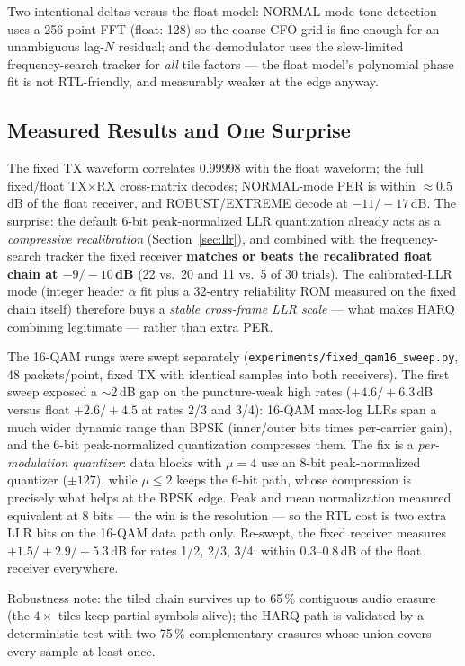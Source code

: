 Two intentional deltas versus the float model: NORMAL-mode tone
detection uses a 256-point FFT (float: 128) so the coarse CFO grid is
fine enough for an unambiguous lag-$N$ residual; and the demodulator
uses the slew-limited frequency-search tracker for \emph{all} tile
factors --- the float model's polynomial phase fit is not RTL-friendly,
and measurably weaker at the edge anyway.

\subsection{Measured Results and One Surprise}

The fixed TX waveform correlates 0.99998 with the float waveform; the
full fixed/float TX$\times$RX cross-matrix decodes; NORMAL-mode PER is
within $\approx$0.5\,dB of the float receiver, and ROBUST/EXTREME
decode at $-11/-17$\,dB.  The surprise: the default 6-bit
peak-normalized LLR quantization already acts as a \emph{compressive
recalibration} (Section~\ref{sec:llr}), and combined with the
frequency-search tracker the fixed receiver \textbf{matches or beats
the recalibrated float chain at $-9/-10$\,dB} (22 vs.\ 20 and 11 vs.\ 5
of 30 trials).  The calibrated-LLR mode (integer header $\alpha$ fit
plus a 32-entry reliability ROM measured on the fixed chain itself)
therefore buys a \emph{stable cross-frame LLR scale} --- what makes
HARQ combining legitimate --- rather than extra PER.

The 16-QAM rungs were swept separately
(\texttt{experiments/fixed\_qam16\_sweep.py}, 48 packets/point, fixed
TX with identical samples into both receivers).  The first sweep
exposed a $\sim$2\,dB gap on the puncture-weak high rates
($+4.6/+6.3$\,dB versus float $+2.6/+4.5$ at rates 2/3 and 3/4):
16-QAM max-log LLRs span a much wider dynamic range than BPSK
(inner/outer bits times per-carrier gain), and the 6-bit
peak-normalized quantization compresses them.  The fix is a
\emph{per-modulation quantizer}: data blocks with $\mu = 4$ use an
8-bit peak-normalized quantizer ($\pm 127$), while $\mu \le 2$ keeps
the 6-bit path, whose compression is precisely what helps at the BPSK
edge.  Peak and mean normalization measured equivalent at 8 bits ---
the win is the resolution --- so the RTL cost is two extra LLR bits on
the 16-QAM data path only.  Re-swept, the fixed receiver measures
$+1.5/+2.9/+5.3$\,dB for rates 1/2, 2/3, 3/4: within 0.3--0.8\,dB of
the float receiver everywhere.

Robustness note: the tiled chain survives up to 65\,\% contiguous
audio erasure (the $4\times$ tiles keep partial symbols alive); the
HARQ path is validated by a deterministic test with two 75\,\%
complementary erasures whose union covers every sample at least once.

